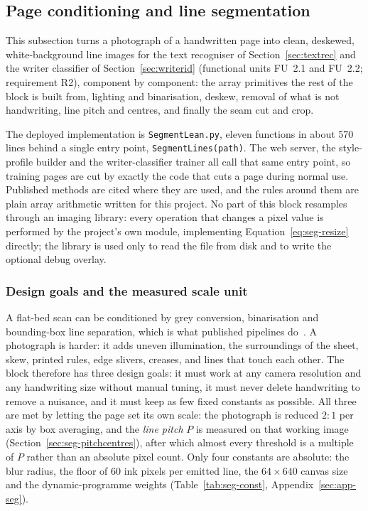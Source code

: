 \subsection{Page conditioning and line segmentation}
\label{sec:segmentation}

This subsection turns a photograph of a handwritten page into clean, deskewed, white-background line images for the text recogniser of Section~\ref{sec:textrec} and the writer classifier of Section~\ref{sec:writerid} (functional units FU~2.1 and FU~2.2; requirement R2), component by component: the array primitives the rest of the block is built from, lighting and binarisation, deskew, removal of what is not handwriting, line pitch and centres, and finally the seam cut and crop.

The deployed implementation is \texttt{SegmentLean.py}, eleven functions in about 570 lines behind a single entry point, \texttt{SegmentLines(path)}. The web server, the style-profile builder and the writer-classifier trainer all call that same entry point, so training pages are cut by exactly the code that cuts a page during normal use. Published methods are cited where they are used, and the rules around them are plain array arithmetic written for this project. No part of this block resamples through an imaging library: every operation that changes a pixel value is performed by the project's own module, implementing Equation~\ref{eq:seg-resize} directly; the library is used only to read the file from disk and to write the optional debug overlay.

\subsubsection{Design goals and the measured scale unit}

A flat-bed scan can be conditioned by grey conversion, binarisation and bounding-box line separation, which is what published pipelines do~\cite{hemanth2022,chen2023}. A photograph is harder: it adds uneven illumination, the surroundings of the sheet, skew, printed rules, edge slivers, creases, and lines that touch each other. The block therefore has three design goals: it must work at any camera resolution and any handwriting size without manual tuning, it must never delete handwriting to remove a nuisance, and it must keep as few fixed constants as possible. All three are met by letting the page set its own scale: the photograph is reduced $2{:}1$ per axis by box averaging, and the \emph{line pitch} $P$ is measured on that working image (Section~\ref{sec:seg-pitchcentres}), after which almost every threshold is a multiple of $P$ rather than an absolute pixel count. Only four constants are absolute: the blur radius, the floor of 60 ink pixels per emitted line, the $64\times640$ canvas size and the dynamic-programme weights (Table~\ref{tab:seg-const}, Appendix~\ref{sec:app-seg}).


